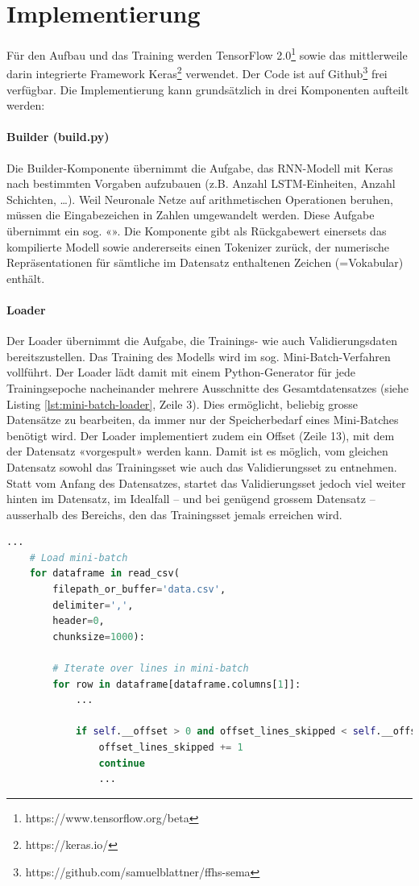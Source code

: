 \section{Implementierung}
\label{sec:model-implementation}

Für den Aufbau und das Training werden TensorFlow 2.0\footnote{https://www.tensorflow.org/beta} sowie das mittlerweile darin integrierte Framework Keras\footnote{https://keras.io/} verwendet.
Der Code ist auf Github\footnote{https://github.com/samuelblattner/ffhs-sema} frei verfügbar.
Die Implementierung kann grundsätzlich in drei Komponenten aufteilt werden:

\paragraph{Builder (build.py)} Die Builder-Komponente übernimmt die Aufgabe, das RNN-Modell mit Keras nach bestimmten Vorgaben aufzubauen (z.B. Anzahl LSTM-Einheiten, Anzahl Schichten, …).
Weil Neuronale Netze auf arithmetischen Operationen beruhen, müssen die Eingabezeichen in Zahlen umgewandelt werden.
Diese Aufgabe übernimmt ein sog. «».
Die Komponente gibt als Rückgabewert einersets das kompilierte Modell sowie andererseits einen Tokenizer zurück, der numerische Repräsentationen für sämtliche im Datensatz enthaltenen Zeichen (=Vokabular) enthält.

\paragraph{Loader} Der Loader übernimmt die Aufgabe, die Trainings- wie auch Validierungsdaten bereitszustellen.
Das Training des Modells wird im sog. Mini-Batch-Verfahren vollführt.
Der Loader lädt damit mit einem Python-Generator für jede Trainingsepoche nacheinander mehrere Ausschnitte des Gesamtdatensatzes (siehe Listing \ref{lst:mini-batch-loader}, Zeile 3).
Dies ermöglicht, beliebig grosse Datensätze zu bearbeiten, da immer nur der Speicherbedarf eines Mini-Batches benötigt wird.
Der Loader implementiert zudem ein Offset (Zeile 13), mit dem der Datensatz «vorgespult» werden kann.
Damit ist es möglich, vom gleichen Datensatz sowohl das Trainingsset wie auch das Validierungsset zu entnehmen.
Statt vom Anfang des Datensatzes, startet das Validierungsset jedoch viel weiter hinten im Datensatz, im Idealfall – und bei genügend grossem Datensatz – ausserhalb des Bereichs, den das Trainingsset jemals erreichen wird.

\begin{lstlisting}[language=Python, caption=Mini-Batch Loader, label=lst:mini-batch-loader]
    ...
    # Load mini-batch
    for dataframe in read_csv(
        filepath_or_buffer='data.csv',
        delimiter=',',
        header=0,
        chunksize=1000):

        # Iterate over lines in mini-batch
        for row in dataframe[dataframe.columns[1]]:
            ...

            if self.__offset > 0 and offset_lines_skipped < self.__offset:
                offset_lines_skipped += 1
                continue
                ...
\end{lstlisting}

